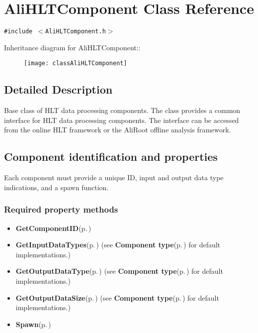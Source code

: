 \section{Ali\-HLTComponent Class Reference}
\label{classAliHLTComponent}
{\tt \#include $<$Ali\-HLTComponent.h$>$}

Inheritance diagram for Ali\-HLTComponent::\begin{figure}[H]
\begin{center}
\leavevmode
\texttt{[image: classAliHLTComponent]}
\end{center}
\end{figure}


\subsection{Detailed Description}
Base class of HLT data processing components. The class provides a common interface for HLT data processing components. The interface can be accessed from the online HLT framework or the Ali\-Root offline analysis framework. \subsection{Component identification and properties}\label{classAliHLTComponent_alihltcomponent-properties}
Each component must provide a unique ID, input and output data type indications, and a spawn function. \subsubsection{Required property methods}\label{classAliHLTComponent_alihltcomponent-req-methods}
\begin{itemize}
\item {\bf Get\-Component\-ID}{\rm (p.\,\pageref{classAliHLTComponent_a9})}\item {\bf Get\-Input\-Data\-Types}{\rm (p.\,\pageref{classAliHLTComponent_a10})} (see {\bf Component type}{\rm (p.\,\pageref{classAliHLTComponent_alihltcomponent-type})} for default implementations.)\item {\bf Get\-Output\-Data\-Type}{\rm (p.\,\pageref{classAliHLTComponent_a11})} (see {\bf Component type}{\rm (p.\,\pageref{classAliHLTComponent_alihltcomponent-type})} for default implementations.)\item {\bf Get\-Output\-Data\-Size}{\rm (p.\,\pageref{classAliHLTComponent_a12})} (see {\bf Component type}{\rm (p.\,\pageref{classAliHLTComponent_alihltcomponent-type})} for default implementations.)\item {\bf Spawn}{\rm (p.\,\pageref{classAliHLTComponent_a13})}\end{itemize}
